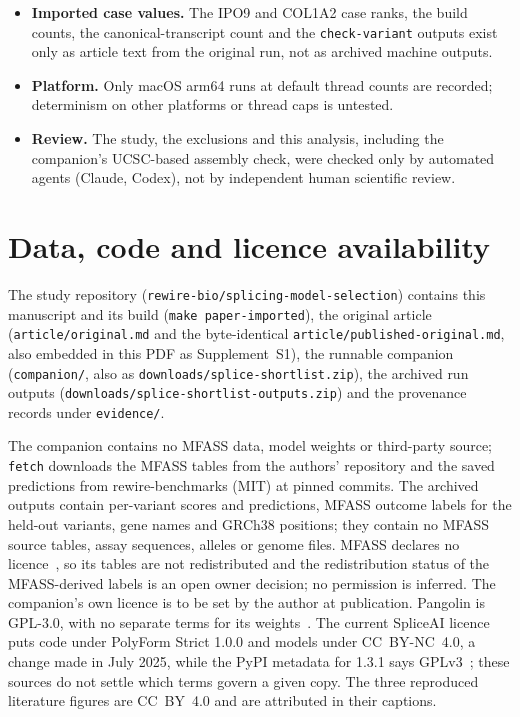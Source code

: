 \documentclass[11pt]{article}
\begin{document}
\begin{itemize}
different scores; specialist inference was not re-executed for this work, and its peak memory was never measured.
\item \textbf{Imported case values.} The IPO9 and COL1A2 case ranks, the build counts, the canonical-transcript count and
the \texttt{check-variant} outputs exist only as article text from the original run, not as archived machine outputs.
\item \textbf{Platform.} Only macOS arm64 runs at default thread counts are recorded; determinism on other platforms or
thread caps is untested.
\item \textbf{Review.} The study, the exclusions and this analysis, including the companion's UCSC-based assembly check,
were checked only by automated agents (Claude, Codex), not by independent human scientific review.
\end{itemize}

\section{Data, code and licence availability}\label{sec:availability}
The study repository (\texttt{rewire-bio/splicing-model-selection}) contains this manuscript and its build
(\texttt{make paper-imported}), the original article (\texttt{article/original.md} and the byte-identical
\texttt{article/published-original.md}, also embedded in this PDF as Supplement~S1), the runnable companion
(\texttt{companion/}, also as \texttt{downloads/splice-shortlist.zip}), the archived run outputs
(\texttt{downloads/splice-shortlist-outputs.zip}) and the provenance records under \texttt{evidence/}.

The companion contains no MFASS data, model weights or third-party source; \texttt{fetch} downloads the MFASS
tables from the authors' repository and the saved predictions from rewire-benchmarks (MIT) at pinned commits. The
archived outputs contain per-variant scores and predictions, MFASS outcome labels for the held-out variants, gene
names and GRCh38 positions; they contain no MFASS source tables, assay sequences, alleles or genome files. MFASS
declares no licence~\citep{kosurilab_mfass}, so its tables are not redistributed and the redistribution status of
the MFASS-derived labels is an open owner decision; no permission is inferred. The companion's own licence is to
be set by the author at publication. Pangolin is GPL-3.0, with no separate terms for its weights~\citep{pangolin_repo}.
The current SpliceAI licence puts code under PolyForm Strict 1.0.0 and models under CC~BY-NC~4.0, a change made in
July 2025, while the PyPI metadata for 1.3.1 says GPLv3~\citep{spliceai_repo,spliceai_pypi}; these sources do not
settle which terms govern a given copy. The three reproduced literature figures are CC~BY~4.0 and are attributed in
their captions.
\end{document}
